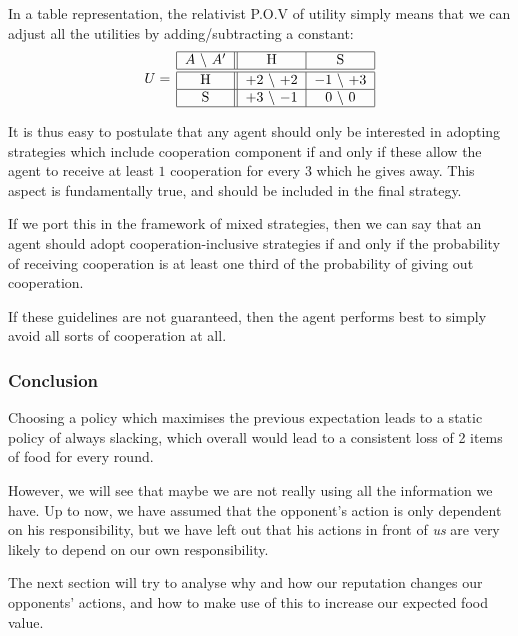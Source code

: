 \documentclass[10pt,fleqn]{article}
\begin{document}
In a table representation, the relativist P.O.V of utility simply means that we
can adjust all the utilities by adding/subtracting a constant:
\begin{equation*}
  U =\,
    \begin{tabular}{|c||c|c|}
      \hline
      $A$ \textbackslash\ $A'$ & H & S \\
      \hline\hline
      H & $+2$ \textbackslash\ $+2$ & $-1$ \textbackslash\ $+3$ \\
      \hline
      S & $+3$ \textbackslash\ $-1$ & $0$ \textbackslash\ $0$ \\
      \hline
    \end{tabular}
\end{equation*}

It is thus easy to postulate that any agent should only be interested in
adopting strategies which include cooperation component if and only if these
allow the agent to receive at least $1$ cooperation for every $3$ which he gives
away. This aspect is fundamentally true, and should be included in the final
strategy.

If we port this in the framework of mixed strategies, then we can say that an
agent should adopt cooperation-inclusive strategies if and only if the
probability of receiving cooperation is at least one third of the probability of
giving out cooperation.

If these guidelines are not guaranteed, then the agent performs best to simply
avoid all sorts of cooperation at all.


\subsubsection{Conclusion}
Choosing a policy which maximises the previous expectation leads to a static
policy of always slacking, which overall would lead to a consistent loss of 2
items of food for every round.

However, we will see that maybe we are not really using all the information we
have. Up to now, we have assumed that the opponent's action is only dependent on
his responsibility, but we have left out that his actions in front of \emph{us}
are very likely to depend on our own responsibility.

The next section will try to analyse why and how our reputation changes our
opponents' actions, and how to make use of this to increase our expected food
value.
\end{document}

